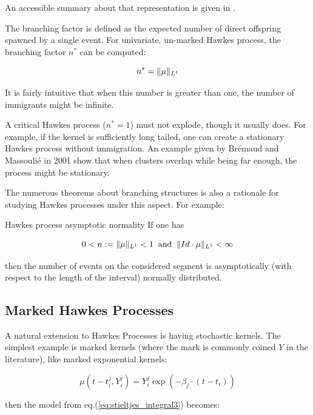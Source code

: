 \documentclass[11pt]{book}
\begin{document}
An accessible summary about that representation is given in \cite{socialhawkes}. 

\begin{definition}
\label{def:branching_factor}
The branching factor is defined as the expected number of direct offspring spawned by a single event. For univariate, un-marked Hawkes process, the branching factor $n^*$ can be computed:

$$ n^* = \lVert  \mu \rVert_{L^1} $$

It is fairly intuitive that when this number is greater than one, the number of immigrants might be infinite. 
\end{definition}


\begin{remarque}
A critical Hawkes process ($n^* = 1$) must not explode, though it usually does. For example, if the kernel is sufficiently long tailed, one can create a stationary Hawkes process without immigration. An example given by Brémaud and Massoulié in 2001 show that when clusters overlap while being far enough, the process might be stationary.
\end{remarque}


The numerous theorems about branching structures is also a rationale for studying Hawkes processes under this aspect. For example:

\begin{theoreme}{Hawkes process asymptotic normality}
If one has

$$ 0 < n := \lVert  \mu \rVert_{L^1} < 1 \: \text{ and }  \: \lVert  Id \cdot \mu \rVert_{L^1} < \infty $$

then the number of events on the considered segment is asymptotically (with respect to the length of the interval) normally distributed.

\end{theoreme}




\subsection{Marked Hawkes Processes}
\label{subsection:marked}
A natural extension to Hawkes Processes is having stochastic kernels. The simplest example is marked kernels (where the mark is commonly coined $Y$ in the literature), like marked exponential kernels:

$$\mu(t- t_i^j, Y_i^j) =  Y_i^j \exp \left ( - \beta_j \cdot ( t - t_i ) \right ) $$

then the model from eq.(\ref{eq:stieltjes_integral3}) becomes:
\end{document}
